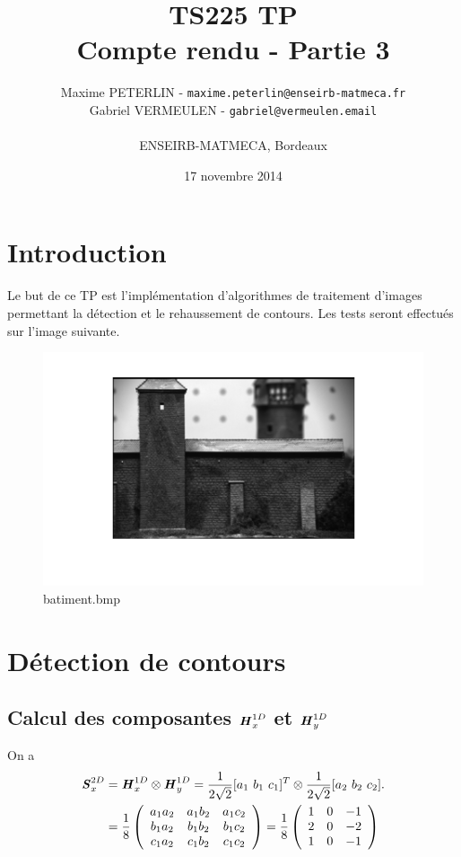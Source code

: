 \documentclass[11pt]{article}
\title{\textbf{TS225 TP}\\Compte rendu - Partie 3}
\author{Maxime PETERLIN - \texttt{maxime.peterlin@enseirb-matmeca.fr}\\
Gabriel VERMEULEN - \texttt{gabriel@vermeulen.email} \\\\{ENSEIRB-MATMECA, Bordeaux}}
\date{17 novembre 2014}
\begin{document}
\maketitle
\tableofcontents

\vspace{1.25cm}

\section{Introduction}

Le but de ce TP est l'implémentation d'algorithmes de traitement d'images permettant la détection et le rehaussement de contours. Les tests seront effectués sur l'image suivante.

		\begin{figure}[h]
			\centering
			\includegraphics[scale=0.5]{img/batiment.png}
			\caption{batiment.bmp}
			\label{img1}
		\end{figure}
		

\newpage

\section{Détection de contours}
	
	\subsection{Calcul des composantes $\textbf{\textit{H}}_x^{1D}$ et $\textbf{\textit{H}}_y^{1D}$}
	
		On a 
		\[
		\begin{align}
			\textbf{\textit{S}}_x^{2D} &= \textbf{\textit{H}}_x^{1D} \otimes \textbf{\textit{H}}_y^{1D} = \frac{1}{2\sqrt{2}}[a_1\ b_1\ c_1]^T \otimes \frac{1}{2\sqrt{2}}[a_2\ b_2\ c_2].\\
			&= \frac{1}{8}\left( \begin{array}{ccc}
a_1a_2 & a_1b_2 & a_1c_2 \\
b_1a_2 & b_1b_2 & b_1c_2 \\
c_1a_2 & c_1b_2 & c_1c_2
\end{array} 
\right)= \frac{1}{8}\left( \begin{array}{ccc}
1 & 0 & -1 \\
2 & 0 & -2 \\
1 & 0 & -1
\end{array} 
\right)
		\end{align}
		\]
		\\
		
\end{document}
